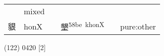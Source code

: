 \documentclass[14pt,a4paper]{scrartcl}
\begin{document}
\begin{longtable}[c]{@{}llllll@{}}
\begin{minipage}[t]{0.14\columnwidth}
\strut\end{minipage} &
\begin{minipage}[t]{0.14\columnwidth}\raggedright\strut
mixed
\strut\end{minipage}\tabularnewline
\begin{minipage}[t]{0.14\columnwidth}\raggedright\strut
貇
\strut\end{minipage} &
\begin{minipage}[t]{0.14\columnwidth}\raggedright\strut
honX
\strut\end{minipage} &
\begin{minipage}[t]{0.14\columnwidth}\raggedright\strut
\strut\end{minipage} &
\begin{minipage}[t]{0.14\columnwidth}\raggedright\strut
墾\textsuperscript{58be~khonX}
\strut\end{minipage} &
\begin{minipage}[t]{0.14\columnwidth}\raggedright\strut
\strut\end{minipage} &
\begin{minipage}[t]{0.14\columnwidth}\raggedright\strut
pure:other
\strut\end{minipage}\tabularnewline
\bottomrule
\end{longtable}

(122) 0420 {[}2{]}
\end{document}
